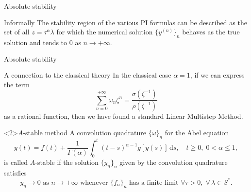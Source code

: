 \documentclass[aspectratio=169,xcolor=dvipsnames]{beamer}
\begin{document}
\begin{frame}{Absolute stability}
\begin{exampleblock}{Informally}
The stability region of the various PI formulas can be described as the set of all $z = \tau^\alpha \lambda$ for which the numerical solution $\{y^{(n)}\}_n$ behaves as the true solution and tends to $0$ as $n \rightarrow + \infty$.
\end{exampleblock}


\end{frame}

\begin{frame}{Absolute stability}
\begin{block}{A connection to the classical theory}
In the classical case $\alpha = 1$, if we can express the term\vspace{-0.7em}
\[
\sum_{n=0}^{+\infty} \omega_n \zeta^n = \frac{\sigma(\zeta^{-1})}{\rho(\zeta^{-1})}
\]
as a rational function, then we have found a standard Linear Multistep Method.
\end{block}

\begin{block}<2>{$A$-stable method}
A convolution quadrature $\{\omega\}_n$ for the Abel equation\vspace{-0.7em}
\[
y(t) = f(t) + \frac{1}{\Gamma(\alpha)} \int_{0}^{t} (t-s)^{\alpha-1} g[y(s)]\,\textrm{d}s, \quad t \geq 0,\;0 < \alpha \leq 1,
\]
is called $A$-stable if the solution $\{y_n\}_n$ given by the convolution quadrature satisfies\vspace{-0.7em}
\[
y_n \rightarrow 0 \text{ as } n \rightarrow + \infty \text{ whenever } \{f_n\}_n \text{ has a finite limit } \forall \tau  > 0, \; \forall\,\lambda \in S^*.
\]
\end{block}

\end{frame}
\end{document}
